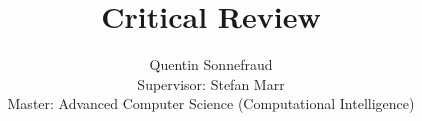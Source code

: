 \documentclass[a4paper, 11pt]{article}
\begin{document}
\title{Critical Review}
\author{Quentin Sonnefraud  \\
Supervisor: Stefan Marr\\
Master: Advanced Computer Science (Computational Intelligence)}
\date{}


\maketitle





\end{document}
